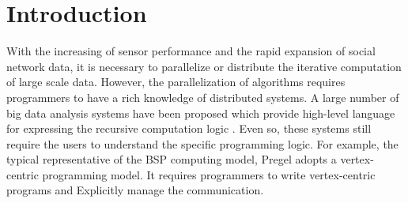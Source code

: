 \section{Introduction}
With the increasing of sensor performance and the rapid expansion of social network data, it is necessary to parallelize or distribute the iterative computation of large scale data. However, the parallelization of algorithms requires programmers to have a rich knowledge of distributed systems. A large number of big data analysis systems have been proposed which provide high-level language for expressing the recursive computation logic \cite{Dean:2004:MSD:1251254.1251264,giraph,maiter,Fan:2017:PSG:3035918.3035942,Malewicz2010Pregel,DBLP:journals/corr/GonzalezBJFHGS15,8017445,Low:2012:DGF:2212351.2212354,Han:2015:GUB:2777598.2777604,grace}. Even so, these systems still require the users to understand the specific programming logic. For example, the typical representative of the BSP computing model, Pregel \cite{Malewicz2010Pregel} adopts a vertex-centric programming model. It requires programmers to write vertex-centric programs and Explicitly manage the communication.

